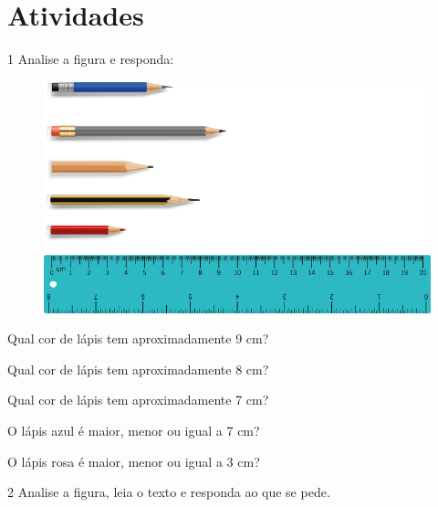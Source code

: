 \pagebreak
\section*{Atividades}

\num{1} Analise a figura e responda:

\begin{figure}[htpb!]
\includegraphics[width=.9\textwidth]{./media/image30.png}
\end{figure}

\begin{escolha}[itemsep=-5pt]
\item  Qual cor de lápis tem aproximadamente 9 cm?


\item  Qual cor de lápis tem aproximadamente 8 cm?


\item  Qual cor de lápis tem aproximadamente 7 cm?


\item  O lápis azul é maior, menor ou igual a 7 cm?


\item  O lápis rosa é maior, menor ou igual a 3 cm?

\end{escolha}

\pagebreak
\num{2} Analise a figura, leia o texto e responda ao que se pede.


